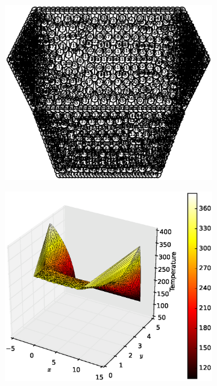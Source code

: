 \documentclass[10pt, a4paper]{article}
\begin{document}
\begin{figure}[H]
\centering
	\begin{subfigure}[H]{0.32\textwidth}
		\includegraphics[width=1.3\textwidth]{fig/test5_1.eps}
		\caption{}
		\label{fig:1}
	\end{subfigure}
	\begin{subfigure}[H]{0.33\textwidth}
		\includegraphics[width=\textwidth]{fig/test5_2.eps}
		\caption{}
		\label{fig:2}

\end{subfigure}
\end{figure}
\end{document}
